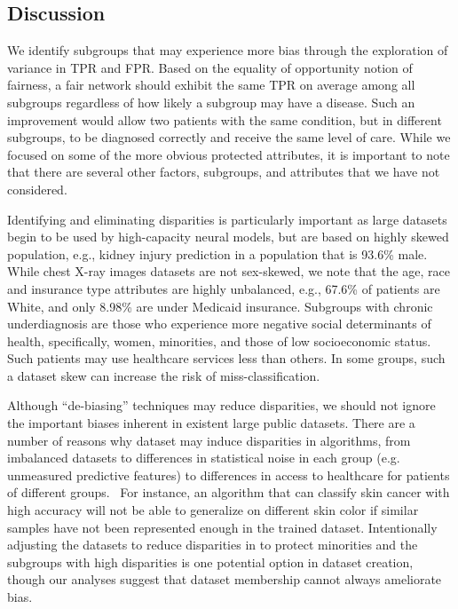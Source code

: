 \documentclass{ws-procs11x85}
\begin{document}
\subsection{Discussion}
We identify subgroups that may experience more bias through the exploration of variance in TPR and FPR. Based on the equality of opportunity notion of fairness, a fair network should exhibit the same TPR on average among all subgroups regardless of how likely a subgroup may have a disease. Such an improvement would allow two patients with the same condition, but in different subgroups, to be diagnosed correctly and receive the same level of care. While we focused on some of the more obvious protected attributes, it is important to note that there are several other factors, subgroups, and attributes that we have not considered.

Identifying and eliminating disparities is particularly important as large datasets begin to be used by high-capacity neural models, but are based on highly skewed population, e.g., kidney injury prediction in a population that is 93.6\% male.\cite{tomavsev2019clinically} While chest X-ray images datasets are not sex-skewed, we note that the age, race and insurance type attributes are highly unbalanced, e.g., 67.6\% of patients are White, and only 8.98\% are under Medicaid insurance. Subgroups with chronic underdiagnosis are those who experience more negative social determinants of health, specifically, women, minorities, and those of low socioeconomic status. Such patients may use healthcare services less than others. In some groups, such a dataset skew can increase the risk of miss-classification.\cite{biasEHR}

 

Although ``de-biasing'' techniques \cite{amini_uncovering_2019, zhang_mitigating_2018} may reduce disparities, we should not ignore the important biases inherent in existent large public datasets. There are a number of reasons why dataset may induce disparities in algorithms, from imbalanced datasets to differences in statistical noise in each group (e.g. unmeasured predictive features) to differences in access to healthcare for patients of different groups.~\cite{chen_why_2018, kawachi2005health} For instance, an algorithm that can classify skin cancer \cite{esteva_dermatologist-level_2017} with high accuracy will not be able to generalize on different skin color if similar samples have not been represented enough in the trained dataset.\cite{shade18} Intentionally adjusting the datasets to reduce disparities in to protect minorities and the subgroups with high disparities is one potential option in dataset creation, though our analyses suggest that dataset membership cannot always ameliorate bias.
\end{document}

